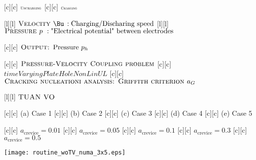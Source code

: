 [c][c] {$\textsc{\tiny Uncharging}$}
[c][c] {$\textsc{\tiny Charging}$}

[l][l] {$\textsc{Velocity } \Bu \, :\text{Charging/Discharing speed}$}
[l][l] {$\textsc{Pressure } p   \,\, :\text{"Electrical potential" between electrodes}$}

[c][c] {$\textsc{Output: } \text{Pressure } p_h$}

[c][c] {$\textsc{Pressure-Velocity Coupling problem}$}
[c][c] {$timeVaryingPlateHoleNonLinUL$}
[c][c] {$\textsc{Cracking nucleationi analysis: Griffith criterion } a_{G}$}

[l][l] {$\textsc{TUAN VO}$}

[c][c] {\small (a) Case 1}
[c][c] {\small (b) Case 2}
[c][c] {\small (c) Case 3}
[c][c] {\small (d) Case 4}
[c][c] {\small (e) Case 5}

[c][c] {\small $a_{\text{crevice}}=0.01$}
[c][c] {\small $a_{\text{crevice}}=0.05$}
[c][c] {\small $a_{\text{crevice}}=0.1$}
[c][c] {\small $a_{\text{crevice}}=0.3$}
[c][c] {\small $a_{\text{crevice}}=0.5$}

\texttt{[image: routine\_woTV\_numa\_3x5.eps]}